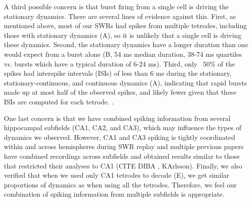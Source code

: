 \documentclass[9pt,lineno]{elife}
\begin{document}
A third possible concern is that burst firing from a single cell is driving the stationary dynamics. There are several lines of evidence against this. First, as mentioned above, most of our SWRs had spikes from multiple tetrodes, including those with stationary dynamics (A), so it is unlikely that a single cell is driving these dynamics. Second, the stationary dynamics have a longer duration than one would expect from a burst alone (B, 54 ms median duration, 38-74 ms quartiles vs. bursts which have a typical duration of 6-24 ms). Third, only ~50\% of the spikes had interspike intervals (ISIs) of less than 6 ms during the stationary, stationary-continuous, and continuous dynamics (A), indicating that rapid bursts made up at most half of the observed spikes, and likely fewer given that these ISIs are computed for each tetrode. .

One last concern is that we have combined spiking information from several hippocampal subfields (CA1, CA2, and CA3), which may influence the types of dynamics we observed. However, CA1 and CA3 spiking is tightly coordinated within and across hemispheres during SWR replay \citep{CarrTransientSlowGamma2012} and multiple previous papers have combined recordings across subfields and obtained results similar to those that restricted their analyses to CA1 (CITE DIBA , KArlsson). Finally, we also verified that when we used only CA1 tetrodes to decode (E), we get similar proportions of dynamics as when using all the tetrodes. Therefore, we feel our combination of spiking information from multiple subfields is appropriate.
\end{document}
